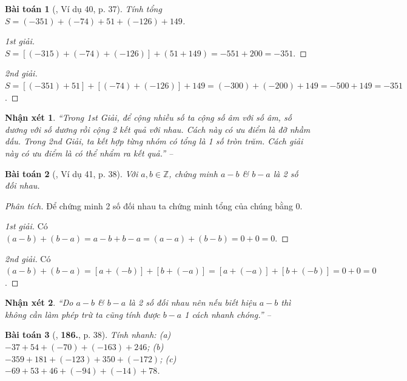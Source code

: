 \documentclass{article}
\numberwithin{equation}{section}
\newtheorem{baitoan}{Bài toán}
\newtheorem{nhanxet}{Nhận xét}[section]
\begin{document}
\begin{baitoan}[\cite{Tuyen_Toan_6}, Ví dụ 40, p. 37]
	Tính tổng $S = (-351) + (-74) + 51 + (-126) + 149$.
\end{baitoan}

\begin{proof}[1st giải]
	$S = [(-315) + (-74) + (-126)] + (51 + 149) = -551 + 200 = -351$.
\end{proof}

\begin{proof}[2nd giải]
	$S = [(-351) + 51] + [(-74) + (-126)] + 149 = (-300) + (-200) + 149 = -500 + 149 = -351$.
\end{proof}

\begin{nhanxet}
	``Trong 1st Giải, để cộng nhiều số ta cộng số âm với số âm, số dương với số dương rồi cộng 2 kết quả với nhau. Cách này có ưu điểm là đỡ nhầm dấu. Trong 2nd Giải, ta kết hợp từng nhóm có tổng là 1 số tròn trăm. Cách giải này có ưu điểm là có thể nhẩm ra kết quả.'' -- \cite[p. 37]{Tuyen_Toan_6}
\end{nhanxet}

\begin{baitoan}[\cite{Tuyen_Toan_6}, Ví dụ 41, p. 38]
	Với $a,b\in\mathbb{Z}$, chứng minh $a - b$ \& $b - a$ là 2 số đối nhau.
\end{baitoan}
\noindent\textit{Phân tích.} Để chứng minh 2 số đối nhau ta chứng minh tổng của chúng bằng $0$.
 
\begin{proof}[1st giải]
	Có $(a - b) + (b - a) = a - b + b - a = (a - a) + (b - b) = 0 + 0 = 0$.
\end{proof}

\begin{proof}[2nd giải]
	Có $(a - b) + (b - a) = [a + (-b)] + [b + (-a)] = [a + (-a)] + [b + (-b)] = 0 + 0 = 0$.
\end{proof}

\begin{nhanxet}
	``Do $a - b$ \& $b - a$ là 2 số đối nhau nên nếu biết hiệu $a - b$ thì không cần làm phép trừ ta cũng tính được $b - a$ 1 cách nhanh chóng.'' -- \cite[p. 38]{Tuyen_Toan_6}
\end{nhanxet}

\begin{baitoan}[\cite{Tuyen_Toan_6}, \textbf{186.}, p. 38]
	Tính nhanh: (a) $-37 + 54 + (-70) + (-163) + 246$; (b) $-359 + 181 + (-123) + 350 + (-172)$; (c) $-69 + 53 + 46 + (-94) + (-14) + 78$.
\end{baitoan}
\end{document}
